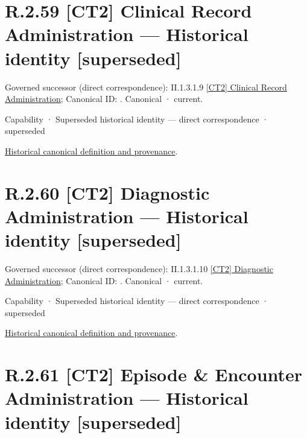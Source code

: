 \section*{R.2.59 [CT2] Clinical Record Administration — Historical identity [superseded]}
\label{navigation:R.2.59}

{\small Governed successor (direct correspondence): II.1.3.1.9 \hyperref[element:ce9e7e7b22054cefb707a650d5be7219]{[CT2] Clinical Record Administration}; Canonical ID: \texttt{}. Canonical · current.}\par
\label{element:be3f2e695eda403fbce8118daf83d386}
{\small Capability · Superseded historical identity — direct correspondence · superseded}\par
\href{../../../../continuum/strategy/capability/be3f2e695eda403fbce8118daf83d386.md}{Historical canonical definition and provenance}.\par
\section*{R.2.60 [CT2] Diagnostic Administration — Historical identity [superseded]}
\label{navigation:R.2.60}

{\small Governed successor (direct correspondence): II.1.3.1.10 \hyperref[element:3cc720ba2e8b4d7a94bb349391d61895]{[CT2] Diagnostic Administration}; Canonical ID: \texttt{}. Canonical · current.}\par
\label{element:2b1a27d5d9944e05b4cf0fcaad4ca433}
{\small Capability · Superseded historical identity — direct correspondence · superseded}\par
\href{../../../../continuum/strategy/capability/2b1a27d5d9944e05b4cf0fcaad4ca433.md}{Historical canonical definition and provenance}.\par
\section*{R.2.61 [CT2] Episode \& Encounter Administration — Historical identity [superseded]}
\label{navigation:R.2.61}

